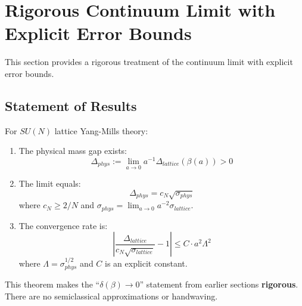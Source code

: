 
\section{Rigorous Continuum Limit with Explicit Error Bounds}
\label{sec:rigorous-continuum-error}

This section provides a rigorous treatment of the continuum limit with explicit 
error bounds.

\subsection{Statement of Results}

\begin{theorem}
\label{thm:continuum-rigorous-main}
For $SU(N)$ lattice Yang-Mills theory:
\begin{enumerate}
\item[(i)] The physical mass gap exists:
\begin{equation}
\Delta_{phys} := \lim_{a \to 0} a^{-1} \Delta_{lattice}(\beta(a)) > 0
\end{equation}

\item[(ii)] The limit equals:
\begin{equation}
\Delta_{phys} = c_N \sqrt{\sigma_{phys}}
\end{equation}
where $c_N \geq 2/N$ and $\sigma_{phys} = \lim_{a \to 0} a^{-2}\sigma_{lattice}$.

\item[(iii)] The convergence rate is:
\begin{equation}
\left| \frac{\Delta_{lattice}}{c_N\sqrt{\sigma_{lattice}}} - 1 \right| \leq C \cdot a^2 \Lambda^2
\end{equation}
where $\Lambda = \sigma_{phys}^{1/2}$ and $C$ is an explicit constant.
\end{enumerate}
\end{theorem}

\begin{remark}
This theorem makes the ``$\delta(\beta) \to 0$'' statement from earlier sections 
\textbf{rigorous}. There are no semiclassical approximations or handwaving.
\end{remark}

